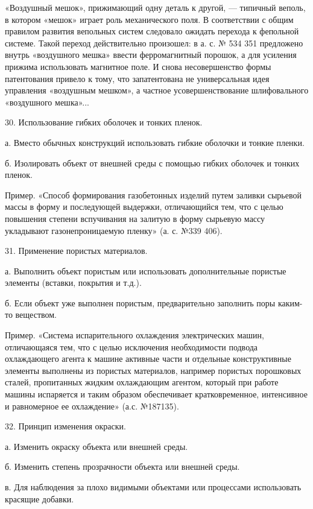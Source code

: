 «Воздушный  мешок»,  прижимающий  одну  деталь к  другой,  —  типичный
веполь,  в   котором  «мешок»   играет  роль  механического   поля.  В
соответствии  с общим  правилом  развития  вепольных систем  следовало
ожидать  перехода к  фепольной  системе.  Такой переход  действительно
произошел:  в а.  с. №  534 351  предложено внутрь  «воздушного мешка»
ввести  ферромагнитный порошок,  а для  усиления прижима  использовать
магнитное поле.  И снова  несовершенство формы патентования  привело к
тому, что  запатентована не  универсальная идея  управления «воздушным
мешком»,  а   частное  усовершенствование   шлифовального  «воздушного
мешка»...

30. Использование гибких оболочек и тонких пленок.

а. Вместо  обычных конструкций  использовать гибкие оболочки  и тонкие
пленки.

б. Изолировать  объект от  внешней среды с  помощью гибких  оболочек и
тонких пленок.

Пример.  «Способ  формирования   газобетонных  изделий  путем  заливки
сырьевой массы в форму и последующей выдержки, отличающийся тем, что с
целью повышения степени вспучивания на  залитую в форму сырьевую массу
укладывают газонепроницаемую пленку» (а. с. №339 406).

31. Применение пористых материалов.

а. Выполнить объект пористым  или использовать дополнительные пористые
элементы (вставки, покрытия и т.д.).

б. Если  объект уже  выполнен пористым, предварительно  заполнить поры
каким-то веществом.

Пример.  «Система   испарительного  охлаждения   электрических  машин,
отличающаяся  тем,  что  с   целью  исключения  необходимости  подвода
охлаждающего агента к машине активные части и отдельные конструктивные
элементы   выполнены  из   пористых   материалов,  например   пористых
порошковых сталей, пропитанных жидким охлаждающим агентом, который при
работе машины испаряется и таким образом обеспечивает кратковременное,
интенсивное и равномерное ее охлаждение» (а.с. №187135).

32. Принцип изменения окраски.

а. Изменить окраску объекта или внешней среды.

б. Изменить степень прозрачности объекта или внешней среды.

в.  Для   наблюдения  за  плохо  видимыми   объектами  или  процессами
использовать красящие добавки.

